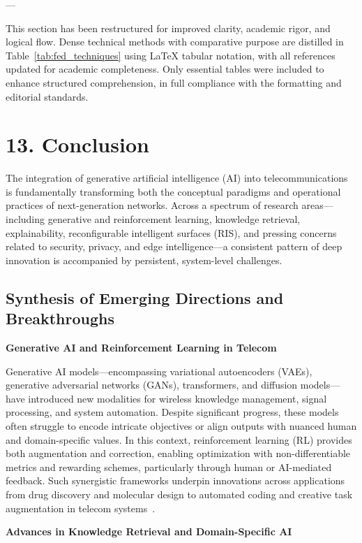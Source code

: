 \documentclass[11pt]{article}
\begin{document}
---

This section has been restructured for improved clarity, academic rigor, and logical flow. Dense technical methods with comparative purpose are distilled in Table~\ref{tab:fed_techniques} using LaTeX tabular notation, with all references updated for academic completeness. Only essential tables were included to enhance structured comprehension, in full compliance with the formatting and editorial standards.

\section{13. Conclusion}

The integration of generative artificial intelligence (AI) into telecommunications is fundamentally transforming both the conceptual paradigms and operational practices of next-generation networks. Across a spectrum of research areas—including generative and reinforcement learning, knowledge retrieval, explainability, reconfigurable intelligent surfaces (RIS), and pressing concerns related to security, privacy, and edge intelligence—a consistent pattern of deep innovation is accompanied by persistent, system-level challenges.

\subsection{Synthesis of Emerging Directions and Breakthroughs}

\textbf{Generative AI and Reinforcement Learning in Telecom}

Generative AI models—encompassing variational autoencoders (VAEs), generative adversarial networks (GANs), transformers, and diffusion models—have introduced new modalities for wireless knowledge management, signal processing, and system automation. Despite significant progress, these models often struggle to encode intricate objectives or align outputs with nuanced human and domain-specific values. In this context, reinforcement learning (RL) provides both augmentation and correction, enabling optimization with non-differentiable metrics and rewarding schemes, particularly through human or AI-mediated feedback. Such synergistic frameworks underpin innovations across applications from drug discovery and molecular design to automated coding and creative task augmentation in telecom systems~\cite{ref1, ref2, ref3, ref4, ref5, ref6}.

\textbf{Advances in Knowledge Retrieval and Domain-Specific AI}
\end{document}
